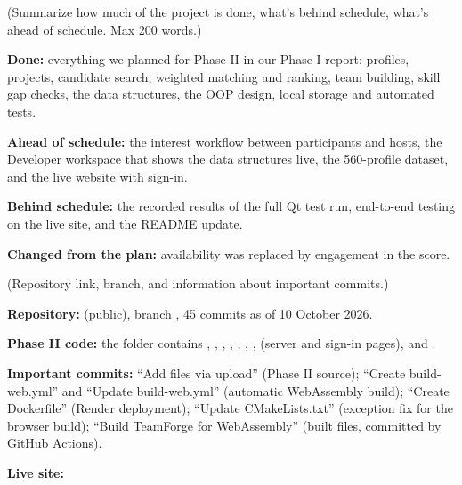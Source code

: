   {(Summarize how much of the project is done, what's behind schedule, what's ahead of schedule. Max 200 words.)}
\TFgap{6.1bp}
\begin{answerbox}
\begin{tfbullets}
\item \textbf{Done:} everything we planned for Phase II in our Phase I report: profiles, projects,
      candidate search, weighted matching and ranking, team building, skill gap checks, the data
      structures, the OOP design, local storage and automated tests.
\item \textbf{Ahead of schedule:} the interest workflow between participants and hosts, the Developer
      workspace that shows the data structures live, the 560-profile dataset, and the live website with
      sign-in.
\item \textbf{Behind schedule:} the recorded results of the full Qt test run, end-to-end testing on the
      live site, and the README update.
\item \textbf{Changed from the plan:} availability was replaced by engagement in the score.
\end{tfbullets}
\end{answerbox}

\newpage
\TFpagetop
{}
  {(Repository link, branch, and information about important commits.)}
\TFgap{6.1bp}
\begin{answerbox}
\begin{tfbullets}
\item \textbf{Repository:}  (public), branch ,
      45 commits as of 10 October 2026.
\item \textbf{Phase II code:} the  folder contains , ,
      , , , , ,  (server and
      sign-in pages),  and .
\item \textbf{Important commits:} ``Add files via upload'' (Phase II source); ``Create build-web.yml'' and
      ``Update build-web.yml'' (automatic WebAssembly build); ``Create Dockerfile'' (Render deployment);
      ``Update CMakeLists.txt'' (exception fix for the browser build); ``Build TeamForge for
      WebAssembly'' (built files, committed by GitHub Actions).
\item \textbf{Live site:} 
\end{tfbullets}
\end{answerbox}

